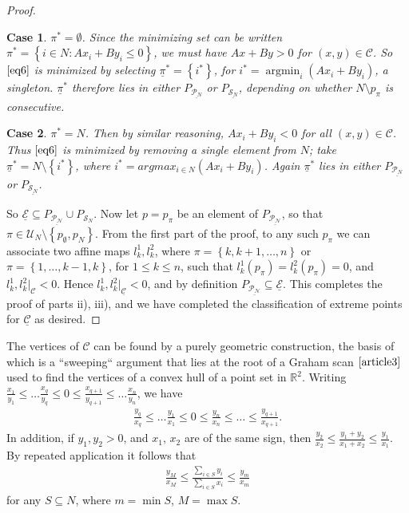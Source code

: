 \documentclass{article}
\theoremstyle{case}
\newtheorem{case}{Case}
\DeclareMathOperator*{\argmin}{argmin} %
\begin{document}
\begin{proof}
\setcounter{case}{0}
\begin{case} $\pi^* = \emptyset$. 
Since the minimizing set can be written $\pi^* = \left\lbrace i \in N \colon Ax_i + By_i \leq 0 \right\rbrace$, we must have $Ax + By > 0$ for $\left( x,y\right) \in \mathcal{C}$. So $\ref{eq6}$ is minimized by selecting $\underline{\pi}^* = \left\lbrace i^*\right\rbrace$, for $i^* = \argmin_i \left( Ax_i + By_i\right)$, a singleton. $\underline{\pi}^*$ therefore lies in either $P_{\underline{\mathcal{P}_N}}$ or $P_{\underline{\mathcal{S}_N}}$, depending on whether $N \setminus p_{\pi}$ is consecutive.
\end{case}
\begin{case} $\pi^* = N$. Then by similar reasoning, $Ax_i + By_i < 0$ for all $\left( x,y\right) \in \mathcal{C}$. Thus $\ref{eq6}$ is minimized by removing a single element from $N$; take $\underline{\pi}^* = N\setminus \left\lbrace i^*\right\rbrace$, where $i^* = argmax_{i \in N} \left( Ax_i + By_i\right)$. Again $\underline{\pi}^*$ lies in either $P_{\underline{\mathcal{P}_N}}$ or $P_{\underline{\mathcal{S}_N}}$.
\end{case}
So $\underline{\mathcal{E}} \subseteq P_{\mathcal{\underline{P_N}}} \cup P_{\mathcal{S}_N}$. Now let $p = p_{\pi}$ be an element of $P_{\mathcal{\underline{P_N}}}$, so that $\pi \in \mathcal{U}_N \setminus \left\lbrace p_{\emptyset}, p_N\right\rbrace$. From the first part of the proof, to any such $p_{\pi}$ we can associate two affine maps $l_k^1, l_k^2$, where $\pi = \left\lbrace k, k+1, \dots, n\right\rbrace$ or $\pi = \left\lbrace 1, \dots, k-1, k\right\rbrace$, for $1 \leq k \leq n$, such that $l_k^1\left( p_{\pi}\right) = l_k^2\left( p_{\pi}\right) = 0$, and $l_k^1, l_k^2 \vert_{\mathcal{C}} < 0$. Hence $l_k^1, l_k^2 \vert_{\mathcal{\underline{C}}} < 0$, and by definition $P_{\mathcal{\underline{P_N}}} \subseteq \underline{\mathcal{E}}$. This completes the proof of parts ii), iii), and we have completed the classification of extreme points for $\underline{\mathcal{C}}$ as desired.
\end{proof}

\vspace{6pt} 
The vertices of $\mathcal{C}$ can be found by a purely geometric construction, the basis of which is a ``sweeping`` argument that lies at the root of a Graham scan $\cite{article3}$ used to find the vertices of a convex hull of a point set in $\mathbb{R}^2$. Writing $\frac{x_1}{y_1} \leq \dots \frac{x_q}{y_q} \leq 0 \leq \frac{x_{q+1}}{y_{q+1}} \leq \dots \frac{x_n}{y_n}$, we have 
\begin{align} \label{eq7}
\frac{y_q}{x_q} \leq \dots \frac{y_1}{x_1} \leq 0 \leq \frac{y_n}{x_n} \leq \dots \leq \frac{y_{q+1}}{x_{q+1}}.
\end{align} 
In addition, if $y_1, y_2 > 0$, and $x_1$, $x_2$ are of the same sign, then $\frac{y_2}{x_2} \leq \frac{y_1+y_2}{x_1+x_2} \leq \frac{y_1}{x_1}.$ By repeated application it follows that
\begin{align} \label{eq8}
\frac{y_M}{x_M} \leq \frac{\sum_{i \in S}y_i}{\sum_{i \in S}x_i} \leq \frac{y_m}{x_m}
\end{align}
for any $S \subseteq N$, where $m = \min S$, $M = \max S$. 
\end{document}
